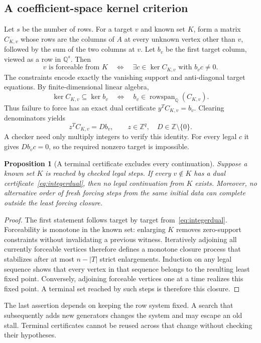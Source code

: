 \documentclass[11pt,letterpaper]{article}
\newtheorem{proposition}[theorem]{Proposition}
\theoremstyle{definition}
\theoremstyle{remark}\newtheorem{remark}[theorem]{Remark}
\newcommand{\Q}{\mathbb Q}\newcommand{\Z}{\mathbb Z}\newcommand{\R}{\mathbb R}
\begin{document}
\subsection{A coefficient-space kernel criterion}
Let $s$ be the number of rows. For a target $v$ and known set $K$, form a matrix $C_{K,v}$ whose rows are the columns of $A$ at every unknown vertex other than $v$, followed by the sum of the two columns at $v$. Let $b_v$ be the first target column, viewed as a row in $\Q^s$. Then
\begin{equation}\label{eq:kernelcriterion}
v\text{ is forceable from }K
\quad\Longleftrightarrow\quad
\exists c\in\ker C_{K,v}\text{ with }b_vc\ne0.
\end{equation}
The constraints encode exactly the vanishing support and anti-diagonal target equations. By finite-dimensional linear algebra,
\begin{equation}\label{eq:dual}
\ker C_{K,v}\subseteq\ker b_v
\quad\Longleftrightarrow\quad
b_v\in\operatorname{rowspan}_{\Q}(C_{K,v}).
\end{equation}
Thus failure to force has an exact dual certificate $y^TC_{K,v}=b_v$. Clearing denominators yields
\begin{equation}\label{eq:integerdual}
z^TC_{K,v}=D b_v,\qquad z\in\Z^q,\quad D\in\Z\setminus\{0\}.
\end{equation}
A checker need only multiply integers to verify this identity. For every legal $c$ it gives $D b_vc=0$, so the required nonzero target is impossible.

\begin{proposition}[A terminal certificate excludes every continuation]\label{prop:terminal}
Suppose a known set $K$ is reached by checked legal steps. If every $v\notin K$ has a dual certificate~\eqref{eq:integerdual}, then no legal continuation from $K$ exists. Moreover, no alternative order of fresh forcing steps from the same initial data can complete outside the least forcing closure.
\end{proposition}
\begin{proof}
The first statement follows target by target from~\eqref{eq:integerdual}. Forceability is monotone in the known set: enlarging $K$ removes zero-support constraints without invalidating a previous witness. Iteratively adjoining all currently forceable vertices therefore defines a monotone closure process that stabilizes after at most $n-|T|$ strict enlargements. Induction on any legal sequence shows that every vertex in that sequence belongs to the resulting least fixed point. Conversely, adjoining forceable vertices one at a time realizes this fixed point. A terminal set reached by such steps is therefore this closure.
\end{proof}
The last assertion depends on keeping the row system fixed. A search that subsequently adds new generators changes the system and may escape an old stall. Terminal certificates cannot be reused across that change without checking their hypotheses.
\end{document}
